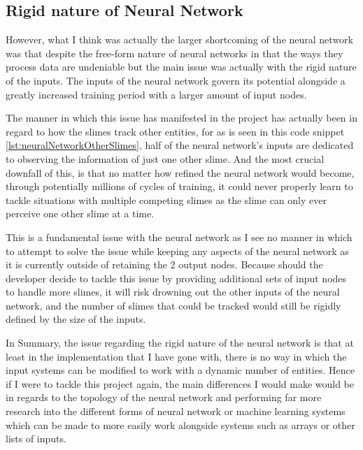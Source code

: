 \subsection{Rigid nature of Neural Network}
However, what I think was actually the larger shortcoming of the neural network was that despite the free-form nature of neural networks in that the ways they process data are undeniable but the main issue was actually with the rigid nature of the inputs. The inputs of the neural network govern its potential alongside a greatly increased training period with a larger amount of input nodes. 
\par
The manner in which this issue has manifested in the project has actually been in regard to how the slimes track other entities, for as is seen in this code snippet \ref{lst:neuralNetworkOtherSlimes}, half of the neural network's inputs are dedicated to observing the information of just one other slime. And the most crucial downfall of this, is that no matter how refined the neural network would become, through potentially millions of cycles of training, it could never properly learn to tackle situations with multiple competing slimes as the slime can only ever perceive one other slime at a time.
\par
This is a fundamental issue with the neural network as I see no manner in which to attempt to solve the issue while keeping any aspects of the neural network as it is currently outside of retaining the 2 output nodes. Because should the developer decide to tackle this issue by providing additional sets of input nodes to handle more slimes, it will risk drowning out the other inputs of the neural network, and the number of slimes that could be tracked would still be rigidly defined by the size of the inputs.
\par
In Summary, the issue regarding the rigid nature of the neural network is that at least in the implementation that I have gone with, there is no way in which the input systems can be modified to work with a dynamic number of entities. Hence if I were to tackle this project again, the main differences I would make would be in regards to the topology of the neural network and performing far more research into the different forms of neural network or machine learning systems which can be made to more easily work alongside systems such as arrays or other lists of inputs.